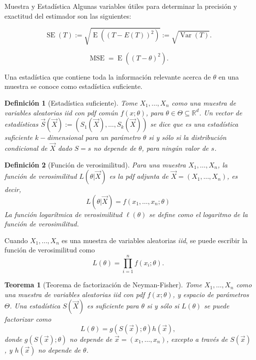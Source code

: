 \documentclass{beamer}
\newtheorem{defi}{Definición}[section]
\newtheorem{theo}{Teorema}[section]
\begin{document}
\begin{frame}[allowframebreaks]{Muestra y Estadística}
	Algunas variables útiles para determinar la precisión y exactitud del estimador son las siguientes:
	
	$$\mathop{SE}(T):=\sqrt{\mathop{E}((T-E(T))^2)}:=\sqrt{\mathop{Var}(T)}.$$
	
	$$\mathop{MSE(T;\theta)}=\mathop{E}((T-\theta)^2).$$
	
	Una estadística que contiene toda la información relevante acerca de $\theta$ en una muestra se conoce como estadística suficiente.
	
	\begin{defi}[Estadística suficiente]
		Tome $X_1,\dots,X_n$ como una muestra de variables aleatorias \textit{iid} con \textit{pdf} común $f(x;\theta)$, para $\theta\in\Theta\subseteq\mathbb{R}^d$. Un vector de estadísticas $\vec{S}(\vec{X}):=(S_1(\vec{X}),\dots, S_k(\vec{X}))$ se dice que es una estadística suficiente $k-$dimensional para un parámetro $\theta$ si y sólo si la distribución condicional de $\vec{X}$ dado $S=s$ no depende de $\theta$, para ningún valor de $s$.
	\end{defi}
		\begin{defi}[Función de verosimilitud]
			Para una muestra $X_1,\dots,X_n$, la función de verosimilitud $L(\theta|\vec{X})$ es la pdf adjunta de $\vec{X}=(X_1,\dots,X_n)$, es decir,
$$L(\theta|\vec{X})=f(x_1,\dots,x_n;\theta)$$			
			La función logarítmica de verosimilitud $\ell(\theta)$ se define como el logaritmo de la función de verosimilitud.
		\end{defi}
		
		Cuando $X_1,\dots,X_n$ es una muestra de variables aleatorias \textit{iid}, se puede escribir la función de verosimilitud como
		$$L(\theta)=\prod_{i=1}^n f(x_i;\theta).$$
		
		\begin{theo}[Teorema de factorización de Neyman-Fisher]
			Tome $X_1,\dots,X_n$ como una muestra de variables aleatorias iid con pdf $f(x;\theta)$, y espacio de parámetros $\Theta$. Una estadística $S(\vec{X})$ es suficiente para $\theta$ si y sólo si $L(\theta)$ se puede factorizar como
			$$L(\theta)=g(S(\vec{x});\theta)h(\vec{x}),$$
			donde $g(S(\vec{x});\theta)$ no depende de $\vec{x}=(x_1,\dots,x_n)$, excepto a través de $S(\vec{x})$, y $h(\vec{x})$ no depende de $\theta$.
		\end{theo}
		
		\end{frame}
\end{document}
